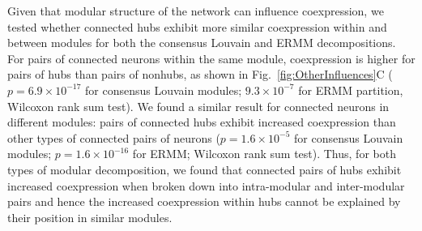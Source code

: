 \documentclass[10pt,letterpaper]{article}
\begin{document}
Given that modular structure of the network can influence coexpression, we tested whether connected hubs exhibit more similar coexpression within and between modules for both the consensus Louvain and ERMM decompositions.
For pairs of connected neurons within the same module, coexpression is higher for pairs of hubs than pairs of nonhubs, as shown in Fig.~\ref{fig:OtherInfluences}C ($p = 6.9\times 10^{-17}$ for consensus Louvain modules; $9.3 \times 10^{-7}$ for ERMM partition, Wilcoxon rank sum test).
We found a similar result for connected neurons in different modules: pairs of connected hubs exhibit increased coexpression than other types of connected pairs of neurons ($p = 1.6 \times 10^{-5}$ for consensus Louvain modules; $p = 1.6 \times 10^{-16}$ for ERMM; Wilcoxon rank sum test).
Thus, for both types of modular decomposition, we found that connected pairs of hubs exhibit increased coexpression when broken down into intra-modular and inter-modular pairs and hence the increased coexpression within hubs cannot be explained by their position in similar modules.
\end{document}
